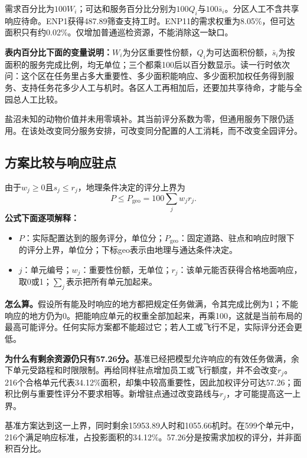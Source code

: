 \documentclass[12pt,a4paper]{article}
\numberwithin{equation}{section}
\begin{document}
需求百分比为$100W_i$；可达和服务百分比分别为$100Q_i$与$100\bar s_i$。分区人工不含共享响应待命。ENP1获得487.89筛查支持工时。ENP11的需求权重为8.05\%，但可达面积只有约0.02\%。仅增加普通巡检资源，不能消除这一缺口。

\noindent\textbf{表内百分比下面的变量说明：}$W_i$为分区重要性份额，$Q_i$为可达面积份额，$\bar s_i$为按面积的服务完成比例，均无单位；三个都乘100后以百分数显示。读一行时依次问：这个区在任务里占多大重要性、多少面积能响应、多少面积加权任务得到服务、支持任务花多少人工与机时。各区人工再相加后，还要加共享待命，才能与全园总人工比较。


盐沼未知的动物价值并未用零填补。其当前评分系数为零，但通用服务下限仍适用。在该处改变同分服务安排，可改变同分配置的人工消耗，而不改变全园评分。
\clearpage

\subsection{方案比较与响应驻点}
由于$w_j\ge0$且$s_j\le r_j$，地理条件决定的评分上界为
\begin{equation}
P\le P_{\mathrm{geo}}=100\sum_jw_jr_j.
\label{eq:geocap}
\end{equation}
\noindent\textbf{公式下面逐项解释：}
\begin{itemize}
\item $P$：实际配置达到的服务评分，单位分；$P_{\mathrm{geo}}$：固定道路、驻点和响应时限下的评分上界，单位分；下标geo表示由地理与通达条件决定。
\item $j$：单元编号；$w_j$：重要性份额，无单位；$r_j$：该单元能否获得合格地面响应，取0或1；$\sum_j$表示把所有单元加起来。
\end{itemize}
\noindent\textbf{怎么算。}假设所有能及时响应的地方都把规定任务做满，令其完成比例为1；不能响应的地方仍为0。把能响应单元的权重全部加起来，再乘100，这就是当前布局的最高可能评分。任何实际方案都不能超过它；若人工或飞行不足，实际评分还会更低。

\noindent\textbf{为什么有剩余资源仍只有57.26分。}基准已经把模型允许响应的有效任务做满，余下单元受路程和时限限制。再给同样驻点增加员工或飞行额度，并不会改变$r_j$。216个合格单元代表34.12\%面积，却集中较高重要性，因此加权评分可达57.26；面积比例与重要性评分不要求相等。新增驻点通过改变路线与$r_j$，才可能提高这一上界。

基准方案达到这一上界，同时剩余15953.89人时和1055.66机时。在599个单元中，216个满足响应标准，占投影面积的34.12\%。57.26分是按需求加权的评分，并非面积百分比。
\end{document}
